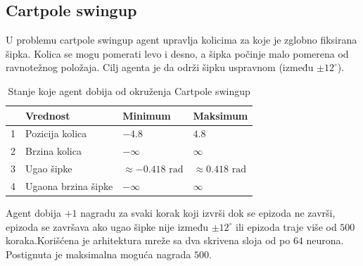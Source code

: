 \documentclass[a4paper,fleqn,12pt]{JMThesis}
\theoremstyle{plain}
\theoremstyle{definition}
\theoremstyle{definition}
\begin{document}
\subsection{Cartpole swingup}
U problemu cartpole swingup agent upravlja kolicima za koje je zglobno fiksirana šipka. Kolica se mogu pomerati levo i desno, a
šipka počinje malo pomerena od ravnotežnog položaja. Cilj agenta je da održi šipku uspravnom (između $\pm 12 ^{\circ}$).\\
\begin{center}
	\begin{table}[!ht]
		\begin{tabular}{|l|l|l|l|}
		\hline
		 & \textbf{Vrednost} & \textbf{Minimum}  & \textbf{Maksimum}\\ \hline
		1 & Pozicija kolica & $-4.8$ & $4.8$\\ \hline
		2 & Brzina kolica & $-\infty$ & $\infty$\\ \hline
		3 & Ugao šipke & $\approx -0.418 \text{ rad}$ & $\approx 0.418 \text{ rad}$\\ \hline
		4 & Ugaona brzina šipke & $-\infty$ & $\infty$\\ \hline
		\end{tabular}
		\caption{Stanje koje agent dobija od okruženja Cartpole swingup}	
	\end{table}	
\end{center}
Agent dobija $+1$ nagradu za svaki korak koji izvrši dok se epizoda ne završi, epizoda se završava ako ugao šipke nije između 
$\pm 12^{\circ} $ ili epizoda traje više od $500$ koraka.Korišćena je arhitektura mreže sa dva skrivena sloja od po $64$ neurona.
Postignuta je maksimalna moguća nagrada $500$.
\end{document}
